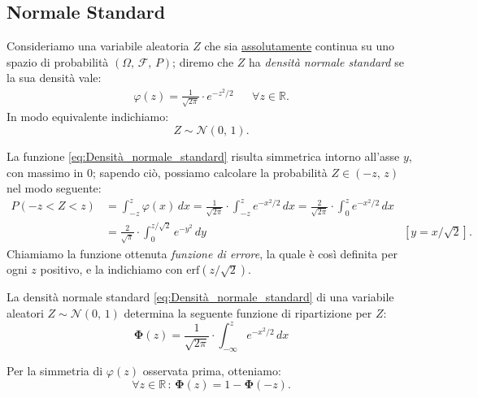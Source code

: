         \subsection{Normale Standard}
            \begin{defn}
                Consideriamo una variabile aleatoria $Z$ che sia \underline{assolutamente} continua su uno spazio di probabilità $(\Omega,\,\mathscr{F},\,P)$; diremo che $Z$ ha \emph{densità normale standard} se la sua densità vale:
                \begin{align}\label{eq:Densità_normale_standard} 
                    \varphi(z) = \frac{1}{\sqrt{2\pi}} \cdot e^{-z^2/2} & &\forall z \in \mathbb{R}
                .\end{align}
                In modo equivalente indichiamo: \[
                    Z \sim \mathcal{N}(0,\, 1)
                .\]
            \end{defn}
            \begin{obsv}
                La funzione \eqref{eq:Densità_normale_standard} risulta simmetrica intorno all'asse $y$, con massimo in 0; sapendo ciò, possiamo calcolare la probabilità $Z \in (-z,\, z)$ nel modo seguente:
                \begin{align*}
                    P(-z < Z < z) &= \int_{-z}^{z} \varphi(x)\, dx = \frac{1}{\sqrt{2\pi}} \cdot \int_{-z}^{z} e^{-x^2/2}\, dx = \frac{2}{\sqrt{2\pi}} \cdot \int_{0}^{z} e^{-x^2/2}\, dx \\
                                  &= \frac{2}{\sqrt{\pi}} \cdot \int_{0}^{z /\sqrt{2}} e^{-y^2}\, dy & [y = x /\sqrt{2}] 
                .\end{align*}
                Chiamiamo la funzione ottenuta \emph{funzione di errore}, la quale è così definita per ogni $z$ positivo, e la indichiamo con $\text{erf}(z /\sqrt{2})$.
            \end{obsv}
            \begin{prty}
                La densità normale standard \eqref{eq:Densità_normale_standard} di una variabile aleatori $Z \sim \mathcal{N}(0,\,1)$ determina la seguente funzione di ripartizione per $Z$:
                \begin{equation}\label{eq:Ripartizione_normale_standard}
                    \mathbf{\Phi}(z) = \frac{1}{\sqrt{2\pi}} \cdot \int_{-\infty}^{z} e^{-x^2 /2}\, dx
                \end{equation}
            \end{prty}
            \begin{obsv}
                Per la simmetria di $\varphi(z)$ osservata prima, otteniamo: \[
                    \forall z \in \mathbb{R} \,:\, \mathbf{\Phi}(z) = 1 - \mathbf{\Phi}(-z)
                .\] 
            \end{obsv}
